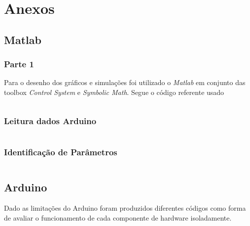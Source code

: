\documentclass[a4paper,11pt]{article}
\begin{document}
\section*{Anexos}



\subsection*{Matlab}

\subsubsection*{Parte 1}
Para o desenho dos gráficos e simulações foi utilizado o \textit{Matlab} em conjunto das toolbox \textit{Control System}\cite{matlabcontrol} e \textit{Symbolic Math}\cite{matlabsymbolic}. Segue o código referente usado

\inputminted[xleftmargin=15pt,linenos,frame=single,framesep=5pt,breaklines=true]{matlab}{../matlab/project.m}

\newpage
\subsubsection*{Leitura dados Arduino}
\inputminted[xleftmargin=15pt,linenos,frame=single,framesep=5pt,breaklines=true]{matlab}{../matlab/plotArduino.m}

\newpage
\subsubsection*{Identificação de Parâmetros}
\inputminted[xleftmargin=15pt,linenos,frame=single,framesep=5pt,breaklines=true]{matlab}{../matlab/identification.m}

\newpage
\subsection*{Arduino}
Dado as limitações do Arduino foram produzidos diferentes códigos como forma de avaliar o funcionamento de cada componente de hardware isoladamente.
\end{document}
